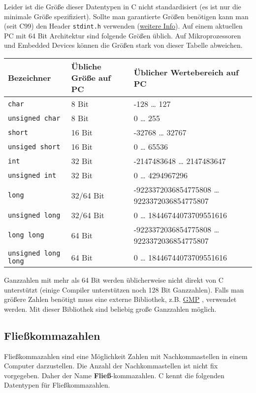 \documentclass[11pt]{article}
\begin{document}
Leider ist die Größe dieser Datentypen in C nicht standardisiert (es
ist nur die minimale Größe spezifiziert). Sollte man garantierte
Größen benötigen kann man (seit C99) den Header \verb~stdint.h~ verwenden
(\href{http://openbook.rheinwerk-verlag.de/c_von_a_bis_z/030_c_anhang_b_017.htm}{weitere Info}). Auf einem aktuellen PC mit 64 Bit Architektur sind
folgende Größen üblich. Auf Mikroprozessoren und Embedded Devices
können die Größen stark von dieser Tabelle abweichen.

\begin{center}
\begin{tabular}{lll}
Bezeichner & Übliche Größe auf PC & Üblicher Wertebereich auf PC\\
\hline
\verb~char~ & 8 Bit & -128 \ldots{} 127\\
\verb~unsigned char~ & 8 Bit & 0 \ldots{} 255\\
\verb~short~ & 16 Bit & -32768 \ldots{} 32767\\
\verb~unsiged short~ & 16 Bit & 0 \ldots{} 65536\\
\verb~int~ & 32 Bit & -2147483648 \ldots{} 2147483647\\
\verb~unsigned int~ & 32 Bit & 0 \ldots{} 4294967296\\
\verb~long~ & 32/64 Bit & -9223372036854775808 \ldots{} 9223372036854775807\\
\verb~unsigned long~ & 32/64 Bit & 0 \ldots{} 18446744073709551616\\
\verb~long long~ & 64 Bit & -9223372036854775808 \ldots{} 9223372036854775807\\
\verb~unsigned long long~ & 64 Bit & 0 \ldots{} 18446744073709551616\\
\end{tabular}
\end{center}

Ganzzahlen mit mehr als 64 Bit werden üblicherweise nicht direkt von C
unterstützt (einige Compiler unterstützen noch 128 Bit Ganzzahlen).
Falls man größere Zahlen benötigt muss eine externe Bibliothek, z.B.
\href{https://gmplib.org/}{GMP} , verwendet werden. Mit dieser Bibliothek sind beliebig große
Ganzzahlen möglich.
\subsection{Fließkommazahlen}
\label{sec-4-2}
Fließkommazahlen sind eine Möglichkeit Zahlen mit Nachkommastellen in
einem Computer darzustellen. Die Anzahl der Nachkommastellen ist nicht
fix vorgegeben. Daher der Name \textbf{Fließ}-kommazahlen. C kennt die
folgenden Datentypen für Fließkommazahlen.
\end{document}
